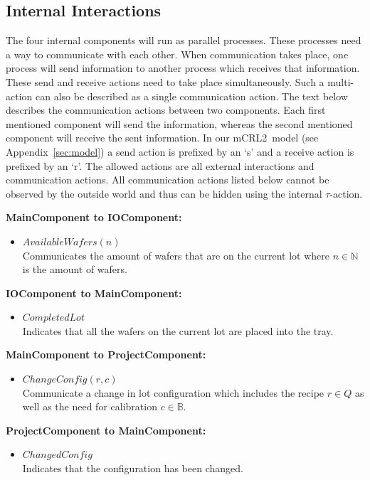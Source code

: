 \subsection{Internal Interactions}
The four internal components will run as parallel processes.
These processes need a way to communicate with each other.
When communication takes place, one process will send information to another process which receives that information.
These send and receive actions need to take place simultaneously.
Such a multi-action can also be described as a single communication action.
The text below describes the communication actions between two components.
Each first mentioned component will send the information, whereas the second mentioned component will receive the sent information.
In our mCRL2~model (see Appendix~\ref{sec:model}) a send action is prefixed by an `s' and a receive action is prefixed by an `r'.
The allowed actions are all external interactions and communication actions.
All communication actions listed below cannot be observed by the outside world and thus can be hidden using the internal $\tau$-action.

\textbf{MainComponent to IOComponent:}
\begin{itemize}
    \item $\mathit{AvailableWafers}(n)$\\
    Communicates the amount of wafers that are on the current lot where $n \in \mathbb{N}$ is the amount of wafers.
\end{itemize}

\textbf{IOComponent to MainComponent:}
\begin{itemize}
    \item $\mathit{CompletedLot}$\\
    Indicates that all the wafers on the current lot are placed into the tray.
\end{itemize}

\textbf{MainComponent to ProjectComponent:}
\begin{itemize}
    \item $\mathit{ChangeConfig}(r, c)$\\
    Communicate a change in lot configuration which includes the recipe $r \in Q$ as well as the need for calibration $c \in \mathbb{B}$.
\end{itemize}

\textbf{ProjectComponent to MainComponent:}
\begin{itemize}
    \item $\mathit{ChangedConfig}$\\
    Indicates that the configuration has been changed.
\end{itemize}

